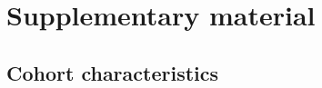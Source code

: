 \documentclass{article}
\begin{document}







% 
\printbibliography

\appendix

\section{Supplementary material}

\subsection{\label{appendix:sample_characteristics}Cohort characteristics}
\end{document}
